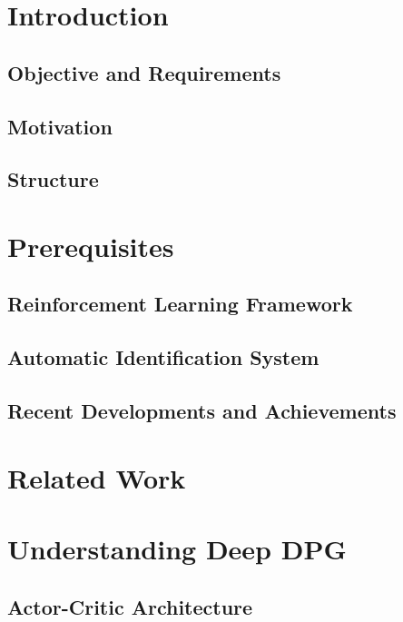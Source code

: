 \section{Introduction}
 \label{chap:intro}
    \subsection{Objective and Requirements}\label{subchap:objective}
    
    \subsection{Motivation}
    
    \subsection{Structure}
    
    
\newpage
\section{Prerequisites}\label{chap:prerequisites}
    \subsection{Reinforcement Learning Framework}\label{chap:rlframework}
    
    \subsection{Automatic Identification System}
    
    \subsection{Recent Developments and Achievements}
    
\newpage
\section{Related Work}\label{chap:relatedWork}


\newpage
\section{Understanding Deep DPG}\label{chap:DDPG}

    \subsection{Actor-Critic Architecture}
    
